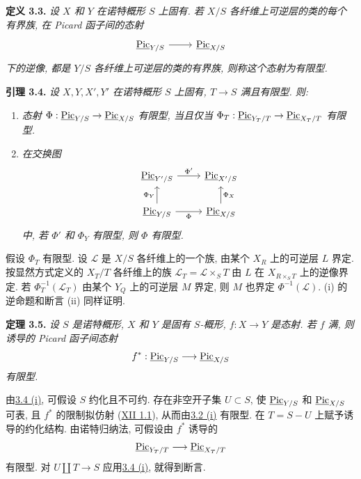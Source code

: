 \textbf{定义 3.3.} \emph{设 \(X\) 和 \(Y\) 在诺特概形 \(S\) 上固有. 若 \(X/S\) 各纤维上可逆层的类的每个有界族, 在 Picard 函子间的态射}
\[
\begin{tikzcd}
\underline{\Pic}_{Y/S}\arrow[r]&\underline{\Pic}_{X/S}
\end{tikzcd}
\]
\emph{下的逆像, 都是 \(Y/S\) 各纤维上可逆层的类的有界族, 则称这个态射为有限型.}

\textbf{引理 3.4.} \emph{设 \(X,Y,X',Y'\) 在诺特概形 \(S\) 上固有, \(T\to S\) 满且有限型. 则:}
\begin{enumerate}[label=(\roman*)]
\item \emph{态射 \(\Phi:\underline{\operatorname{Pic}}_{Y/S}\to\underline{\operatorname{Pic}}_{X/S}\) 有限型, 当且仅当 \(\Phi_T:\underline{\operatorname{Pic}}_{Y_T/T}\to\underline{\operatorname{Pic}}_{X_T/T}\) 有限型.}
\item \emph{在交换图}
\[
\begin{tikzcd}
\underline{\Pic}_{Y'/S}\arrow[r,"\Phi'"]&
\underline{\Pic}_{X'/S}\\
\underline{\Pic}_{Y/S}\arrow[r,"\Phi"']\arrow[u,"\Phi_Y"]&
\underline{\Pic}_{X/S}\arrow[u,"\Phi_X"']
\end{tikzcd}
\]
\emph{中, 若 \(\Phi'\) 和 \(\Phi_Y\) 有限型, 则 \(\Phi\) 有限型.}
\end{enumerate}

假设 \(\Phi_T\) 有限型. 设 \(\mathscr L\) 是 \(X/S\) 各纤维上的一个族, 由某个 \(X_R\) 上的可逆层 \(L\) 界定. 按显然方式定义的 \(X_T/T\) 各纤维上的族 \(\mathscr L_T=\mathscr L\times_S T\) 由 \(L\) 在 \(X_{R\times_S T}\) 上的逆像界定. 若 \(\Phi_T^{-1}(\mathscr L_T)\) 由某个 \(Y_Q\) 上的可逆层 \(M\) 界定, 则 \(M\) 也界定 \(\Phi^{-1}(\mathscr L)\). (i) 的逆命题和断言 (ii) 同样证明.

\textbf{定理 3.5.} \emph{设 \(S\) 是诺特概形, \(X\) 和 \(Y\) 是固有 \(S\)-概形, \(f:X\to Y\) 是态射. 若 \(f\) 满, 则诱导的 Picard 函子间态射}
\[
f^*:\underline{\operatorname{Pic}}_{Y/S}\longrightarrow\underline{\operatorname{Pic}}_{X/S}
\]
\emph{有限型.}

由\hyperlink{sga6.e13.lem.3-4}{3.4 (i)}, 可假设 \(S\) 约化且不可约. 存在非空开子集 \(U\subset S\), 使 \(\underline{\operatorname{Pic}}_{Y/S}\) 和 \(\underline{\operatorname{Pic}}_{X/S}\) 可表, 且 \(f^*\) 的限制拟仿射 (\hyperlink{sga6.e12.thm.1-1}{XII 1.1}), 从而由\hyperlink{sga6.e13.prop.3-2}{3.2 (i)} 有限型. 在 \(T=S-U\) 上赋予诱导的约化结构. 由诺特归纳法, 可假设由 \(f^*\) 诱导的
\[
\underline{\operatorname{Pic}}_{Y_T/T}\longrightarrow\underline{\operatorname{Pic}}_{X_T/T}
\]
有限型. 对 \(U\amalg T\to S\) 应用\hyperlink{sga6.e13.lem.3-4}{3.4 (i)}, 就得到断言.

